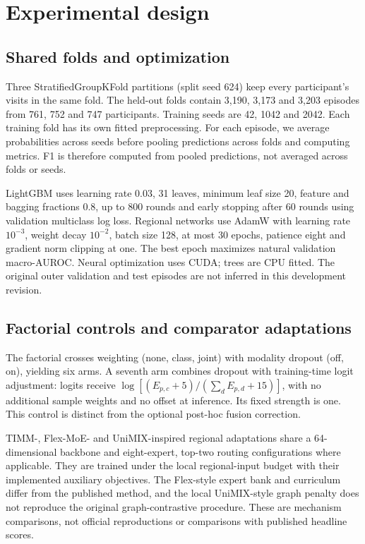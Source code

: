 \section{Experimental design}\label{sec:setup}
\subsection{Shared folds and optimization}
Three StratifiedGroupKFold partitions (split seed 624) keep every participant's visits in the same fold. The held-out folds contain 3,190, 3,173 and 3,203 episodes from 761, 752 and 747 participants. Training seeds are 42, 1042 and 2042. Each training fold has its own fitted preprocessing. For each episode, we average probabilities across seeds before pooling predictions across folds and computing metrics. F1 is therefore computed from pooled predictions, not averaged across folds or seeds.

LightGBM uses learning rate 0.03, 31 leaves, minimum leaf size 20, feature and bagging fractions 0.8, up to 800 rounds and early stopping after 60 rounds using validation multiclass log loss. Regional networks use AdamW with learning rate $10^{-3}$, weight decay $10^{-2}$, batch size 128, at most 30 epochs, patience eight and gradient norm clipping at one. The best epoch maximizes natural validation macro-AUROC. Neural optimization uses CUDA; trees are CPU fitted. The original outer validation and test episodes are not inferred in this development revision.

\subsection{Factorial controls and comparator adaptations}
The factorial crosses weighting (none, class, joint) with modality dropout (off, on), yielding six arms. A seventh arm combines dropout with training-time logit adjustment: logits receive $\log[(E_{p,c}+5)/(\sum_d E_{p,d}+15)]$, with no additional sample weights and no offset at inference. Its fixed strength is one. This control is distinct from the optional post-hoc fusion correction.

TIMM-, Flex-MoE- and UniMIX-inspired regional adaptations share a 64-dimensional backbone and eight-expert, top-two routing configurations where applicable. They are trained under the local regional-input budget with their implemented auxiliary objectives. The Flex-style expert bank and curriculum differ from the published method, and the local UniMIX-style graph penalty does not reproduce the original graph-contrastive procedure. These are mechanism comparisons, not official reproductions or comparisons with published headline scores.

